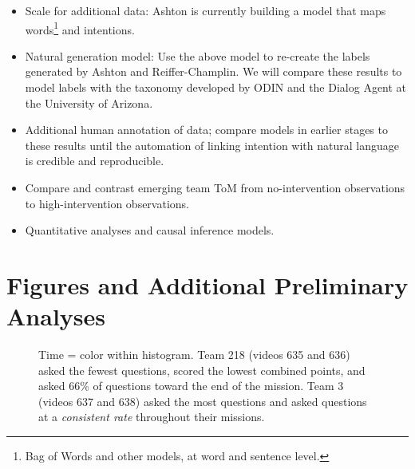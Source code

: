 \begin{itemize}
    \item Scale for additional data: Ashton is currently building a model that maps words\footnote{Bag of Words and other models, at word and sentence level.} and intentions.
    \item Natural generation model: Use the above model to re-create the labels
        generated by Ashton and Reiffer-Champlin. We will compare these results
        to model labels with the taxonomy developed by ODIN and the Dialog
        Agent at the University of Arizona.
    \item Additional human annotation of data; compare models in earlier stages to these results until the automation of linking intention with natural language is credible and reproducible.
    \item Compare and contrast emerging team ToM from no-intervention observations to high-intervention observations.
    \item Quantitative analyses and causal inference models.
\end{itemize}



\section{Figures and Additional Preliminary Analyses}

\begin{figure}[h!]
    \centering
    \caption{Time = color within histogram. Team 218 (videos 635 and 636) asked the
        fewest questions, scored the lowest combined points, and asked 66\%
        of questions toward the end of the mission. Team 3 (videos 637 and 638) asked
        the most questions and asked questions at a \emph{consistent rate} throughout their missions.}
    \end{figure}
    
